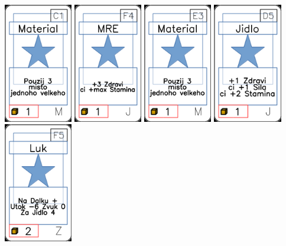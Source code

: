 \documentclass[a4paper]{article}
\begin{document}
	\includegraphics[width=3.0cm]{img-1_40}
	\includegraphics[width=3.0cm]{img-1_28}
	\includegraphics[width=3.0cm]{img-1_52}
	\includegraphics[width=3.0cm]{img-1_19}
	\includegraphics[width=3.0cm]{img-1_89}
\end{document}
